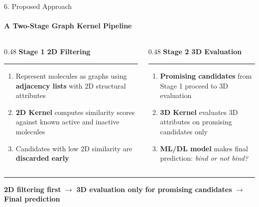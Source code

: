 \documentclass[aspectratio=169, 11pt]{beamer}
\begin{document}
\begin{frame}{6. Proposed Approach}
    \framesubtitle{A Two-Stage Graph Kernel Pipeline}

    \vspace{0.3em}

    \begin{columns}[T]

        \begin{column}{0.48\textwidth}
            \textbf{Stage 1 \hspace{0.2em} 2D Filtering}
            \vspace{0.3em}
            \hrule
            \vspace{0.4em}
            \begin{enumerate}
                \setlength\itemsep{0.5em}
                \item Represent molecules as graphs using \textbf{adjacency lists} 
                with 2D structural attributes
                \item \textbf{2D Kernel} computes similarity scores against 
                known active and inactive molecules
                \item Candidates with low 2D similarity are \textbf{discarded early}
            \end{enumerate}
        \end{column}

        \hfill\vrule\hfill

        \begin{column}{0.48\textwidth}
            \textbf{Stage 2 \hspace{0.2em} 3D Evaluation}
            \vspace{0.3em}
            \hrule
            \vspace{0.4em}
            \begin{enumerate}
                \setlength\itemsep{0.5em}
                \item \textbf{Promising candidates} from Stage 1 proceed to 
                3D evaluation
                \item \textbf{3D Kernel} evaluates 3D attributes on promising candidates only
                \item \textbf{ML/DL model} makes final prediction: 
                \textit{bind or not bind?}
            \end{enumerate}
        \end{column}

    \end{columns}

    \vspace{0.8em}
    \hrule
    \vspace{0.4em}

    \centering
    \small
    \textbf{2D filtering first} $\longrightarrow$ \textbf{3D evaluation only for promising candidates} 
    $\longrightarrow$ \textbf{Final prediction}
\end{frame}
\end{document}

